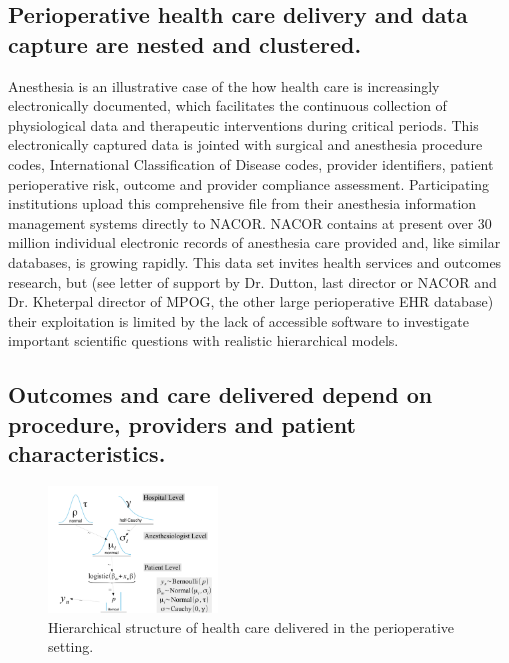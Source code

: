 \documentclass[11pt,notitlepage]{article}
\begin{document}
\subsection*{Perioperative health care delivery and data capture are nested and clustered.}
Anesthesia is an illustrative case of the how health care is increasingly 
electronically documented, which facilitates the continuous collection of 
physiological data and therapeutic interventions during critical periods. 
This electronically captured data 
is jointed with surgical and anesthesia procedure codes, International 
Classification of Disease codes, provider identifiers, patient perioperative 
risk, outcome and provider compliance assessment. Participating institutions upload 
this comprehensive file from their anesthesia information management systems
directly to NACOR. NACOR contains at present over 30 million individual 
electronic records of anesthesia care provided and, like similar databases, is 
growing rapidly. This data set invites health services and outcomes research, 
but (see letter of support by Dr. Dutton, last director or 
NACOR and Dr. Kheterpal director of MPOG, the other large perioperative EHR 
database) their exploitation is limited by the lack of accessible software to investigate 
important scientific questions with realistic hierarchical models.

\subsection*{Outcomes and care delivered depend on procedure, providers and patient characteristics.} 

\begin{figure} 
\includegraphics[width=0.4\textwidth]{Figures/DistrogramNACOR.pdf} 
\caption{Hierarchical structure of health care delivered in the perioperative setting.}
\label{fig:NACOR}
\end{figure}
\end{document}
